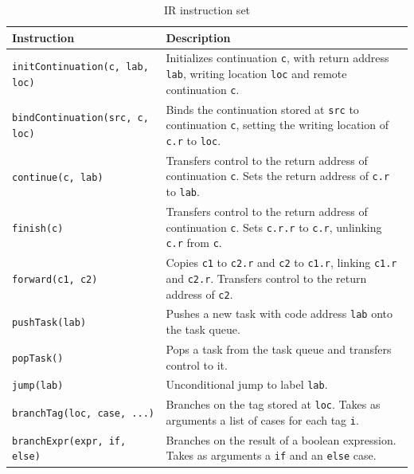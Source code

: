 \setlength{\tabcolsep}{0pt}
\begin{table}
\centering
\caption{IR instruction set}
\label{tab:IRinstructionset}
\begin{tabular}{p{0.385\linewidth} p{0.61\linewidth}}
\hline
\textbf{Instruction} & \textbf{Description} \\
\hline

\texttt{initContinuation(c, lab, loc)} &
Initializes continuation \texttt{c}, with return address \texttt{lab}, writing location \texttt{loc} and remote continuation \texttt{c}. \\

\texttt{bindContinuation(src, c, loc)} &
Binds the continuation stored at \texttt{src} to continuation \texttt{c}, setting the writing location of \texttt{c.r} to \texttt{loc}. \\

\texttt{continue(c, lab)} &
Transfers control to the return address of continuation \texttt{c}. Sets the return address of \texttt{c.r} to \texttt{lab}. \\

\texttt{finish(c)} &
Transfers control to the return address of continuation \texttt{c}. Sets \texttt{c.r.r} to \texttt{c.r}, unlinking \texttt{c.r} from \texttt{c}. \\

\texttt{forward(c1, c2)} &
Copies \texttt{c1} to \texttt{c2.r} and \texttt{c2} to \texttt{c1.r}, linking  \texttt{c1.r} and \texttt{c2.r}. Transfers control to the return address of \texttt{c2}. \\

\texttt{pushTask(lab)} &
Pushes a new task with code address \texttt{lab} onto the task queue. \\

\texttt{popTask()} &
Pops a task from the task queue and transfers control to it. \\

\texttt{jump(lab)} &
Unconditional jump to label \texttt{lab}. \\

\texttt{branchTag(loc, case, ...)} &
Branches on the tag stored at \texttt{loc}. Takes as arguments a list of cases for each tag \texttt{i}. \\

\texttt{branchExpr(expr, if, else)} &
Branches on the result of a boolean expression. Takes as arguments a \texttt{if} and an \texttt{else} case. \\


\end{tabular}
\end{table}
